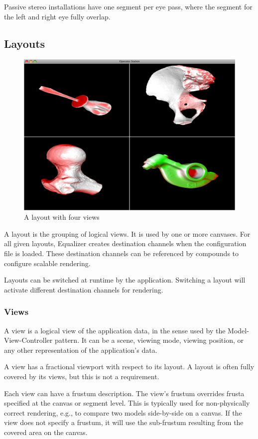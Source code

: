 \documentclass[10pt,a4]{scrartcl}
\begin{document}
Passive stereo installations have one segment per eye pass, where the
segment for the left and right eye fully overlap.

\subsection{\label{sLayout}Layouts}

\begin{figure}
  \includegraphics[width=.382\textwidth]{images/layout.png}
  {\caption{\label{fLayout}A layout with four views}}
  \vspace{-4ex}
\end{figure}
A layout is the grouping of logical views. It is used by one or more
canvases. For all given layouts, Equalizer creates destination channels
when the configuration file is loaded. These destination channels can be
referenced by compounds to configure scalable rendering.

Layouts can be switched at runtime by the application. Switching a
layout will activate different destination channels for rendering.

\subsubsection{Views}

A view is a logical view of the application data, in the sense used by
the Model-View-Controller pattern. It can be a scene, viewing mode,
viewing position, or any other representation of the application's data.

A view has a fractional viewport with respect to its layout.  A layout
is often fully covered by its views, but this is not a requirement.

Each view can have a frustum description. The view's frustum overrides
frusta specified at the canvas or segment level. This is typically used
for non-physically correct rendering, e.g., to compare two models
side-by-side on a canvas. If the view does not specify a frustum, it
will use the sub-frustum resulting from the covered area on the canvas.
\end{document}

